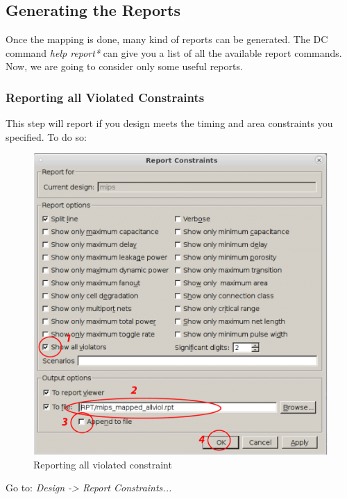 \subsection{Generating the Reports}

Once the mapping is done, many kind of reports can be generated. The DC command \textit{help report*} can give you a list of all the available report commands. Now, we are going to consider only some useful reports.

\subsubsection{Reporting all Violated Constraints}
This step will report if you design meets the timing and area constraints you specified. To do so:
 \begin{enumerate}
	\parbox[t]{\dimexpr\textwidth-\leftmargin}{%
	\begin{figure}
		\vspace{0mm}
		\centering
		\vspace{-\baselineskip}
	\includegraphics[scale=0.3]{figures/lab3_design_compiler/allviol}
\caption{Reporting all violated constraint}
\label{fig_allviol}
	\end{figure}
	\item Go to: \textit {Design -> Report Constraints...}
}
\end{enumerate}
